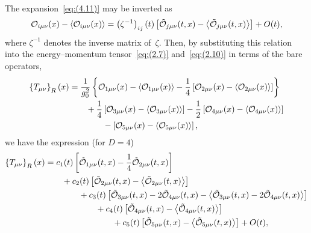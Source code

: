 The expansion~\eqref{eq:(4.11)} may be inverted as
\begin{equation}
   \mathcal{O}_{i\mu\nu}(x)-\left\langle\mathcal{O}_{i\mu\nu}(x)\right\rangle
   =\left(\zeta^{-1}\right)_{ij}(t)
   \left[\Tilde{\mathcal{O}}_{j\mu\nu}(t,x)
   -\left\langle\Tilde{\mathcal{O}}_{j\mu\nu}(t,x)\right\rangle\right]
   +O(t),
\label{eq:(4.12)}
\end{equation}
where $\zeta^{-1}$ denotes the inverse matrix of~$\zeta$. Then, by substituting
this relation into the energy--momentum tensor~\eqref{eq:(2.7)}
and~\eqref{eq:(2.10)} in terms of the bare operators,
\begin{align}
   \left\{T_{\mu\nu}\right\}_R(x)
   &=\frac{1}{g_0^2}\left\{
   \mathcal{O}_{1\mu\nu}(x)
   -\left\langle\mathcal{O}_{1\mu\nu}(x)\right\rangle
   -\frac{1}{4}
   \left[\mathcal{O}_{2\mu\nu}(x)
   -\left\langle\mathcal{O}_{2\mu\nu}(x)\right\rangle\right]
   \right\}
\notag\\
   &\qquad{}
   +\frac{1}{4}
   \left[\mathcal{O}_{3\mu\nu}(x)
   -\left\langle\mathcal{O}_{3\mu\nu}(x)\right\rangle\right]
   -\frac{1}{2}
   \left[\mathcal{O}_{4\mu\nu}(x)
   -\left\langle\mathcal{O}_{4\mu\nu}(x)\right\rangle\right]
\notag\\
   &\qquad\qquad{}
   -\left[\mathcal{O}_{5\mu\nu}(x)
   -\left\langle\mathcal{O}_{5\mu\nu}(x)\right\rangle\right],
\label{eq:(4.13)}
\end{align}
we have the expression (for $D=4$)
\begin{align}
   \left\{T_{\mu\nu}\right\}_R(x)
   &=c_1(t)\left[
   \Tilde{\mathcal{O}}_{1\mu\nu}(t,x)
   -\frac{1}{4}\Tilde{\mathcal{O}}_{2\mu\nu}(t,x)
   \right]
\notag\\
   &\qquad{}
   +c_2(t)\left[
   \Tilde{\mathcal{O}}_{2\mu\nu}(t,x)
   -\left\langle\Tilde{\mathcal{O}}_{2\mu\nu}(t,x)\right\rangle
   \right]
\notag\\
   &\qquad\qquad{}
   +c_3(t)\left[
   \Tilde{\mathcal{O}}_{3\mu\nu}(t,x)
   -2\Tilde{\mathcal{O}}_{4\mu\nu}(t,x)
   -\left\langle
   \Tilde{\mathcal{O}}_{3\mu\nu}(t,x)
   -2\Tilde{\mathcal{O}}_{4\mu\nu}(t,x)
   \right\rangle
   \right]
\notag\\
   &\qquad\qquad\qquad{}
   +c_4(t)\left[
   \Tilde{\mathcal{O}}_{4\mu\nu}(t,x)
   -\left\langle\Tilde{\mathcal{O}}_{4\mu\nu}(t,x)\right\rangle
   \right]
\notag\\
   &\qquad\qquad\qquad\qquad{}
   +c_5(t)\left[
   \Tilde{\mathcal{O}}_{5\mu\nu}(t,x)
   -\left\langle\Tilde{\mathcal{O}}_{5\mu\nu}(t,x)\right\rangle
   \right]+O(t),
\label{eq:(4.14)}
\end{align}

